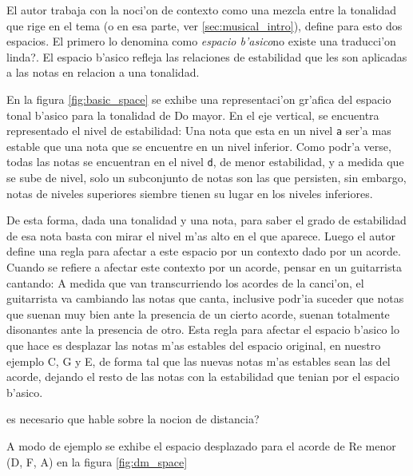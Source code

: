 El autor trabaja con la noci'on de contexto como una mezcla entre la tonalidad que rige en el tema (o en esa parte, ver \ref{sec:musical_intro}), define para esto dos 
espacios. El primero lo denomina como \emph{espacio b'asico}\alert{no existe una traducci'on linda?}. El espacio b'asico refleja las relaciones de estabilidad que les 
son aplicadas a las notas en relacion a una tonalidad. 

En la figura \ref{fig:basic_space} se exhibe una representaci'on gr'afica del espacio tonal b'asico para la tonalidad de Do mayor. En el eje vertical, se encuentra
representado el nivel de estabilidad: Una nota que esta en un nivel \texttt{a} ser'a mas estable que una nota que se encuentre en un nivel inferior. Como 
podr'a verse, todas las notas se encuentran en el nivel \texttt{d}, de menor estabilidad, y a medida que se sube de nivel, solo un subconjunto de notas son las 
que persisten, sin embargo, notas de niveles superiores siembre tienen su lugar en los niveles inferiores.

\begin{imagen}
    \width{10cm}
\end{imagen}

De esta forma, dada una tonalidad y una nota, para saber el grado de estabilidad de esa nota basta con mirar el nivel m'as alto en el que aparece.
Luego el autor define una regla para afectar a este espacio por un contexto dado por un acorde. Cuando se refiere a afectar este contexto por un acorde, pensar
en un guitarrista cantando: A medida que van transcurriendo los acordes de la canci'on, el guitarrista va cambiando las notas que canta, inclusive podr'ia
suceder que notas que suenan muy bien ante la presencia de un cierto acorde, suenan totalmente disonantes ante la presencia de otro. 
Esta regla para afectar el espacio b'asico lo que hace es desplazar las notas m'as estables del espacio original, en nuestro ejemplo C, G y E, de forma tal
que las nuevas notas m'as estables sean las del acorde, dejando el resto de las notas con la estabilidad que tenian por el espacio b'asico. 

\alert{es necesario que hable sobre la nocion de distancia?}

A modo de ejemplo se exhibe el espacio desplazado para el acorde de Re menor (D, F, A) en la figura \ref{fig:dm_space}

